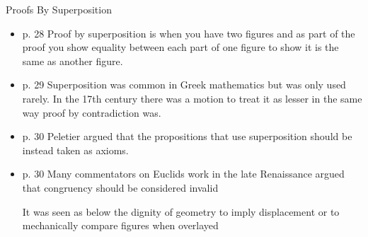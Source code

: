 \documentclass{report}
\begin{document}
{\large Proofs By Superposition}
\begin{itemize}
    \item p. 28 Proof by superposition is when you have two figures
        and as part of the proof you show equality between
        each part of one figure to show it is the same as
        another figure.
    \item p. 29 Superposition was common in Greek mathematics
        but was only used rarely. In the 17th century
        there was a motion to treat it as lesser in the same
        way proof by contradiction was.
    \item p. 30 Peletier argued that the propositions that
        use superposition should be instead taken as axioms.
    \item p. 30 Many commentators on Euclids work in the
        late Renaissance argued that congruency should be
        considered invalid
        \begin{mdframed}
            It was seen as below the dignity of geometry
            to imply displacement or to mechanically compare
            figures when overlayed
        \end{mdframed}
\end{itemize}
\end{document}
